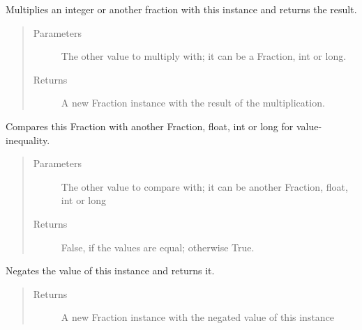 \documentclass[letterpaper,10pt,english]{sphinxmanual}
\begin{document}
\begin{fulllineitems}
\begin{fulllineitems}
\label{\detokenize{fraction:fraction.Fraction.__mul__}}
Multiplies an integer or another fraction with this instance and returns the result.
\begin{quote}\begin{description}
\item[{Parameters}] \leavevmode
{} \textendash{} The other value to multiply with; it can be a Fraction, int or long.

\item[{Returns}] \leavevmode
A new Fraction instance with the result of the multiplication.

\end{description}\end{quote}

\end{fulllineitems}


\begin{fulllineitems}
\label{\detokenize{fraction:fraction.Fraction.__ne__}}
Compares this Fraction with another Fraction, float, int or long for value-inequality.
\begin{quote}\begin{description}
\item[{Parameters}] \leavevmode
{} \textendash{} The other value to compare with; it can be another Fraction, float, int or long

\item[{Returns}] \leavevmode
False, if the values are equal; otherwise True.

\end{description}\end{quote}

\end{fulllineitems}


\begin{fulllineitems}
\label{\detokenize{fraction:fraction.Fraction.__neg__}}
Negates the value of this instance and returns it.
\begin{quote}\begin{description}
\item[{Returns}] \leavevmode
A new Fraction instance with the negated value of this instance


\end{description}
\end{quote}
\end{fulllineitems}
\end{fulllineitems}
\end{document}
